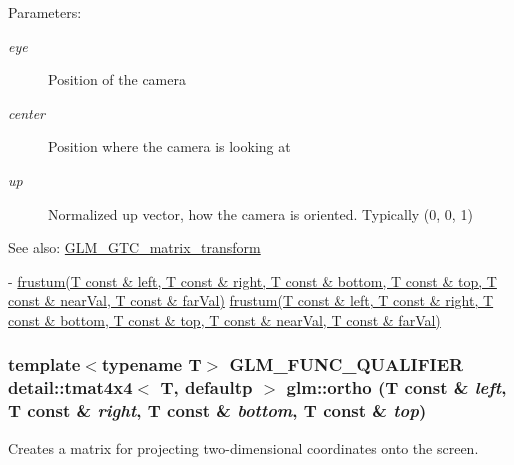 \begin{Desc}
\item[Parameters:]
\begin{description}
\item[{\em eye}]Position of the camera \item[{\em center}]Position where the camera is looking at \item[{\em up}]Normalized up vector, how the camera is oriented. Typically (0, 0, 1) \end{description}
\end{Desc}
\begin{Desc}
\item[See also:]\hyperlink{group__gtc__matrix__transform}{GLM\_\-GTC\_\-matrix\_\-transform} 

- \hyperlink{group__gtc__matrix__transform_g0ef39da6d6c83806dea5ff455eb225cf}{frustum(T const \& left, T const \& right, T const \& bottom, T const \& top, T const \& nearVal, T const \& farVal)} \hyperlink{group__gtc__matrix__transform_g0ef39da6d6c83806dea5ff455eb225cf}{frustum(T const \& left, T const \& right, T const \& bottom, T const \& top, T const \& nearVal, T const \& farVal)} \end{Desc}
\hypertarget{group__gtc__matrix__transform_gdab1dbf2b9ceda856624bafa09b3de07}{
\subsubsection[ortho]{\setlength{\rightskip}{0pt plus 5cm}template$<$typename T$>$ GLM\_\-FUNC\_\-QUALIFIER detail::tmat4x4$<$ T, defaultp $>$ glm::ortho (T const \& {\em left}, \/  T const \& {\em right}, \/  T const \& {\em bottom}, \/  T const \& {\em top})}}
\label{group__gtc__matrix__transform_gdab1dbf2b9ceda856624bafa09b3de07}


Creates a matrix for projecting two-dimensional coordinates onto the screen.

